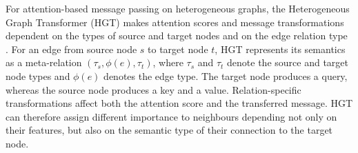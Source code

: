 For attention-based message passing on heterogeneous graphs, the
Heterogeneous Graph Transformer (HGT) makes attention scores and message
transformations dependent on the types of source and target nodes and on the
edge relation type \textcite{hu2020heterogeneous}.
For an edge from source node $s$ to target node $t$, HGT represents its
semantics as a meta-relation $(\tau_s, \phi(e), \tau_t)$, where $\tau_s$
and $\tau_t$ denote the source and target node types and $\phi(e)$ denotes
the edge type.
The target node produces a query, whereas the source node produces a key and
a value. Relation-specific transformations affect both the attention score
and the transferred message.
HGT can therefore assign different importance to neighbours depending not
only on their features, but also on the semantic type of their connection to
the target node.




